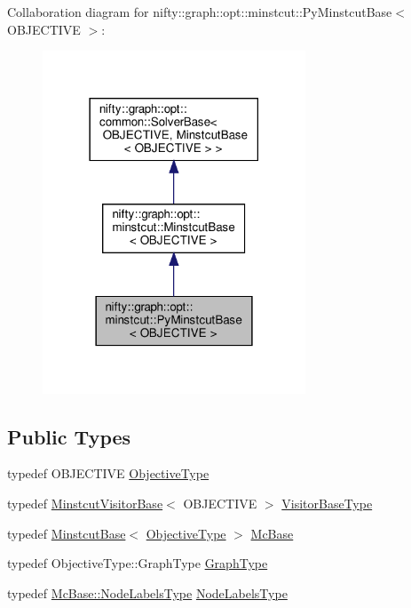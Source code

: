Collaboration diagram for nifty\+:\+:graph\+:\+:opt\+:\+:minstcut\+:\+:Py\+Minstcut\+Base$<$ O\+B\+J\+E\+C\+T\+I\+VE $>$\+:
\nopagebreak
\begin{figure}[H]
\begin{center}
\leavevmode
\includegraphics[width=222pt]{classnifty_1_1graph_1_1opt_1_1minstcut_1_1PyMinstcutBase__coll__graph}
\end{center}
\end{figure}
\subsection*{Public Types}
\begin{DoxyCompactItemize}
\item 
typedef O\+B\+J\+E\+C\+T\+I\+VE \hyperlink{classnifty_1_1graph_1_1opt_1_1minstcut_1_1PyMinstcutBase_acadf3b778a5c31979914063a2603223c}{Objective\+Type}
\item 
typedef \hyperlink{namespacenifty_1_1graph_1_1opt_1_1minstcut_a42d7fa14edf7c8f367a49541f392e5aa}{Minstcut\+Visitor\+Base}$<$ O\+B\+J\+E\+C\+T\+I\+VE $>$ \hyperlink{classnifty_1_1graph_1_1opt_1_1minstcut_1_1PyMinstcutBase_ab9d7b03bc4b7359bde367f0613964ede}{Visitor\+Base\+Type}
\item 
typedef \hyperlink{classnifty_1_1graph_1_1opt_1_1minstcut_1_1MinstcutBase}{Minstcut\+Base}$<$ \hyperlink{classnifty_1_1graph_1_1opt_1_1minstcut_1_1PyMinstcutBase_acadf3b778a5c31979914063a2603223c}{Objective\+Type} $>$ \hyperlink{classnifty_1_1graph_1_1opt_1_1minstcut_1_1PyMinstcutBase_a47c2cf30fc07e8ba8b9c9f9a9b6d8e84}{Mc\+Base}
\item 
typedef Objective\+Type\+::\+Graph\+Type \hyperlink{classnifty_1_1graph_1_1opt_1_1minstcut_1_1PyMinstcutBase_abc84a9ebd6fbe5cbbe7049c4da44009e}{Graph\+Type}
\item 
typedef \hyperlink{classnifty_1_1graph_1_1opt_1_1common_1_1SolverBase_abefd51561de2fd009f6bed6bef6009ea}{Mc\+Base\+::\+Node\+Labels\+Type} \hyperlink{classnifty_1_1graph_1_1opt_1_1minstcut_1_1PyMinstcutBase_a9bec148d1b9938c8bb61fc079addda6f}{Node\+Labels\+Type}
\end{DoxyCompactItemize}
